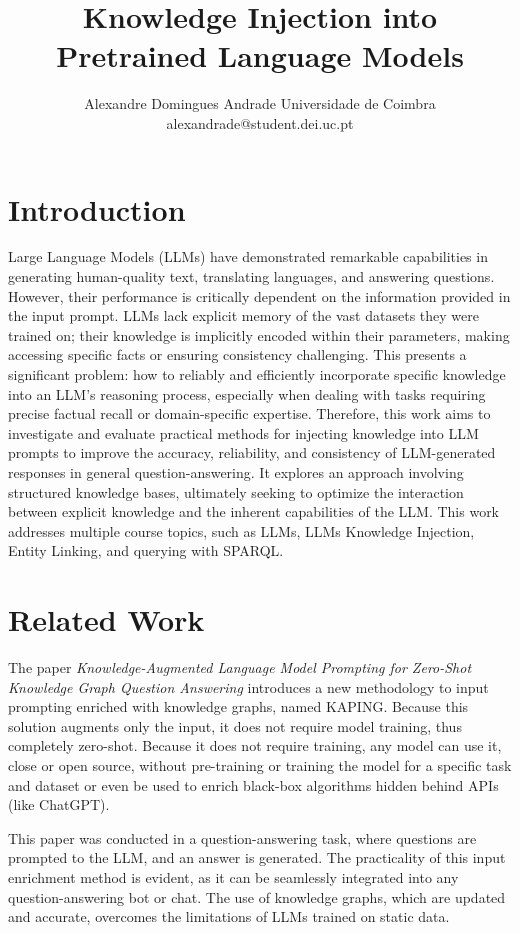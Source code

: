 \documentclass{article}
\title{Knowledge Injection into Pretrained Language Models}
\author{
    Alexandre Domingues Andrade
    \affiliations
    Universidade de Coimbra
    \emails
    alexandrade@student.dei.uc.pt
}
\begin{document}
\maketitle

\section{Introduction}

Large Language Models (LLMs) have demonstrated remarkable capabilities in generating human-quality text, translating languages, and answering questions. However, their performance is critically dependent on the information provided in the input prompt. LLMs lack explicit memory of the vast datasets they were trained on;  their knowledge is implicitly encoded within their parameters, making accessing specific facts or ensuring consistency challenging. This presents a significant problem:  how to reliably and efficiently incorporate specific knowledge into an LLM's reasoning process, especially when dealing with tasks requiring precise factual recall or domain-specific expertise. Therefore, this work aims to investigate and evaluate practical methods for injecting knowledge into LLM prompts to improve the accuracy, reliability, and consistency of LLM-generated responses in general question-answering. It explores an approach involving structured knowledge bases, ultimately seeking to optimize the interaction between explicit knowledge and the inherent capabilities of the LLM. This work addresses multiple course topics, such as LLMs, LLMs Knowledge Injection, Entity Linking, and querying with SPARQL.

\section{Related Work}

The paper \textit{Knowledge-Augmented Language Model Prompting
for Zero-Shot Knowledge Graph Question Answering}\cite{baek2023knowledgeaugmentedlanguagemodelprompting} introduces a new methodology to input prompting enriched with knowledge graphs, named KAPING. Because this solution augments only the input, it does not require model training, thus completely zero-shot. Because it does not require training, any model can use it, close or open source, without pre-training or training the model for a specific task and dataset or even be used to enrich black-box algorithms hidden behind APIs (like ChatGPT).

This paper was conducted in a question-answering task, where questions are prompted to the LLM, and an answer is generated. The practicality of this input enrichment method is evident, as it can be seamlessly integrated into any question-answering bot or chat. The use of knowledge graphs, which are updated and accurate, overcomes the limitations of LLMs trained on static data.
\end{document}
